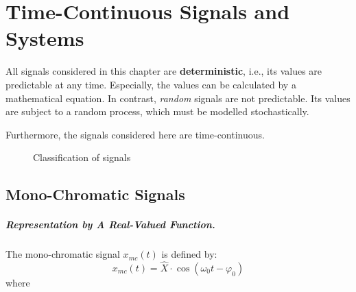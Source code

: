 \chapter{Time-Continuous Signals and Systems}

\begin{refsection}

All signals considered in this chapter are  \textbf{deterministic}, i.e., its values are predictable at any time. Especially, the values can be calculated by a mathematical equation. In contrast, \emph{random} signals are not predictable. Its values are subject to a random process, which must be modelled stochastically.

Furthermore, the signals considered here are time-continuous.

\begin{figure}[H]
	\centering
	\caption{Classification of signals}
	\label{fig:ch02:timecont_signals_classif}
\end{figure}

\section{Mono-Chromatic Signals}

\paragraph{Representation by A Real-Valued Function.}

The mono-chromatic signal $x_{mc}(t)$ is defined by:
\begin{equation}
	x_{mc}(t) = \hat{X} \cdot \cos\left(\omega_0 t - \varphi_0\right)
	\label{eq:ch02:mono_chrom_eq}
\end{equation}
where


\end{refsection}
